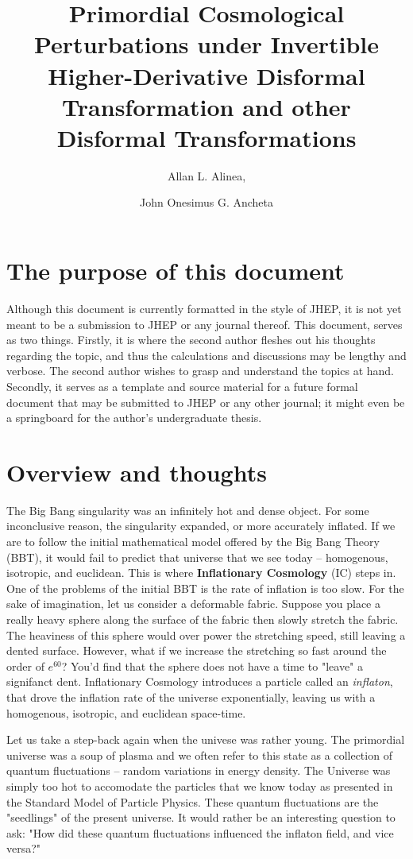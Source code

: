\documentclass[a4paper,11pt]{article}
\title{\boldmath Primordial Cosmological Perturbations under Invertible Higher-Derivative Disformal Transformation and other Disformal Transformations}
\author[1]{Allan L. Alinea,\note{Corresponding author.}}
\author[]{John Onesimus G. Ancheta}
\affiliation[]{Astrophysics, Particle Physics, Nuclear Physics Research Cluster
\\Institute of Physics, \\ University of the Philippines Los Baños \\ 4031 College, Los Baños, Laguna, Philippines}
\begin{document}
 
\maketitle
\flushbottom

\section{The purpose of this document} \label{sec:purpose}
Although this document is currently formatted in the style of JHEP, it is not yet meant
to be a submission to JHEP or any journal thereof. This document, serves as two things. Firstly, it is where the second author
fleshes out his thoughts regarding the topic, and thus the calculations and discussions may be lengthy and verbose.
The second author wishes to grasp and understand the topics at hand. Secondly, it serves as a template and source material
for a future formal document that may be submitted to JHEP or any other journal; it might even be a springboard for the author's undergraduate thesis. 


\section{Overview and thoughts}

The Big Bang singularity was an infinitely hot and dense object. For some inconclusive reason,
the singularity expanded, or more accurately inflated. If we are to follow the initial mathematical model offered
by the Big Bang Theory (BBT), it would fail to predict that universe that we see today -- homogenous, isotropic, and euclidean.
This is where \textbf{Inflationary Cosmology} (IC) steps in. One of the problems of the initial BBT is the rate of inflation
is too slow. For the sake of imagination, let us consider a deformable fabric. Suppose you place a really heavy sphere along
the surface of the fabric then slowly stretch the fabric. The heaviness of this sphere would over power the stretching speed,
still leaving a dented surface. However, what if we increase the stretching so fast around the order of $e^{60}$? You'd find that
the sphere does not have a time to "leave" a signifanct dent. Inflationary Cosmology introduces a particle called an \textit{inflaton}, that drove the inflation rate of the universe 
exponentially, leaving us with a homogenous, isotropic, and euclidean space-time. 

Let us take a step-back again when the univese was rather young. The primordial universe was a soup of plasma and we often
refer to this state as a collection of quantum fluctuations -- random variations in energy density. The Universe was simply too hot
to accomodate the particles that we know today as presented in the Standard Model of Particle Physics. These quantum fluctuations are the "seedlings"
of the present universe. It would rather be an interesting question to ask: "How did these quantum fluctuations influenced the inflaton field, and vice versa?"
\end{document}
